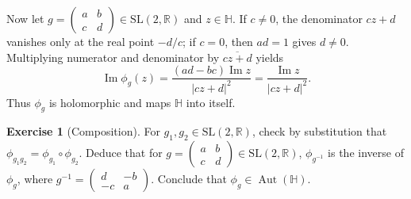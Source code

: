 \documentclass[11pt]{article}
\theoremstyle{plain}
\theoremstyle{definition}
\newtheorem{exercise}[theorem]{Exercise}
\theoremstyle{boldremark}
\theoremstyle{remark}
\numberwithin{equation}{section}
\newcommand{\R}{\mathbb{R}}
\DeclareMathOperator{\Imag}{Im}
\begin{document}
Now let $g=\left(\begin{smallmatrix}a&b\\c&d\end{smallmatrix}\right)\in\mathrm{SL}(2,\R)$
and $z\in\mathbb H$. If $c\ne0$, the denominator $cz+d$ vanishes only at
the real point $-d/c$; if $c=0$, then $ad=1$ gives $d\ne0$. Multiplying
numerator and denominator by $\overline{cz+d}$ yields
\begin{equation}
 \Imag\phi_g(z)=\frac{(ad-bc)\Imag z}{|cz+d|^2}
               =\frac{\Imag z}{|cz+d|^2}.
\end{equation}
Thus $\phi_g$ is holomorphic and maps $\mathbb H$ into itself.

\newpage
\begin{exercise}[Composition]
For $g_1,g_2\in\mathrm{SL}(2,\R)$, check by substitution that
$\phi_{g_1g_2}=\phi_{g_1}\circ\phi_{g_2}$. Deduce that for
$g=\left(\begin{smallmatrix}a&b\\c&d\end{smallmatrix}\right)\in\mathrm{SL}(2,\R)$,
$\phi_{g^{-1}}$ is the inverse of $\phi_g$, where
$g^{-1}=\left(\begin{smallmatrix}d&-b\\-c&a\end{smallmatrix}\right)$.
Conclude that $\phi_g\in\operatorname{Aut}(\mathbb H)$.
\end{exercise}
\end{document}
